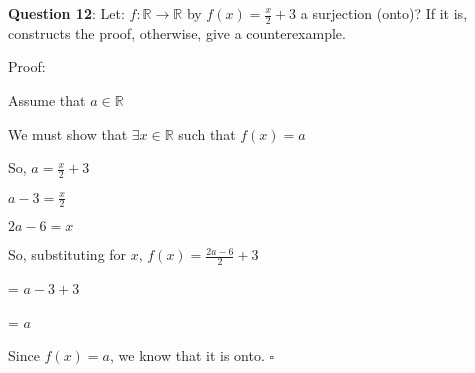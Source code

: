 \documentclass{article} %
\newcommand{\question}[2][]{\begin{flushleft}
        \textbf{Question #1}: #2
\end{flushleft}}
\begin{document}
    \question[12]{Let: $f: \mathbb{R} \rightarrow \mathbb{R}$ by $f(x) = \frac{x}{2} + 3$ a surjection (onto)? If it is, constructs the proof, 
    otherwise, give a counterexample.}

    Proof:

    Assume that $a \in \mathbb{R}$
    
    We must show that $\exists x \in \mathbb{R}$ such that $f(x) = a$

    So, $a = \frac{x}{2} + 3$

    \tabto{1cm} $a-3 = \frac{x}{2}$

    \tabto{1cm} $2a - 6 = x$

    So, substituting for $x$, $f(x) = \frac{2a - 6}{2} + 3$

    \tabto{4.82cm} = $a - 3 + 3$

    \tabto{4.82cm} = $a$

    Since $f(x) = a$, we know that it is onto. $\square$



    
\end{document}
